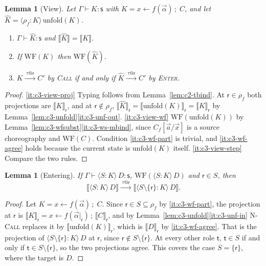 \documentclass[11pt]{report}
\makeatletter
\theoremstyle{plain}
\newtheorem{lemma}[theorem]{Lemma}
\theoremstyle{definition}
\theoremstyle{remark}
\newcommand{\rr}{\mathsf{r}}
\newcommand{\sr}{\mathsf{s}}
\newcommand{\tr}{\mathsf{t}}
\newcommand{\bind}[3]{#1 \leftarrow #2\,;\;#3}
\newcommand{\rt}[3]{\langle #1 : #2\rangle\,#3}
\newcommand{\unfold}[1]{\mathrm{unfold}(#1)}
\newcommand{\WF}{\mathrm{WF}}
\newcommand{\tauat}[1]{\tau\mathord{@}#1}
\newcommand{\lto}[1]{\xrightarrow{\;#1\;}}
\newcommand{\proj}[2]{\llbracket #1 \rrbracket_{#2}}
\newcommand{\projn}[1]{\llbracket #1 \rrbracket}
\newcommand{\rn}[1]{{\normalfont\scshape #1}}
\makeatother
\begin{document}
\begin{lemma}[View]\label{lem:c3-view}
  Let $\Gamma\vdash K:\sr$ with $K=\bind{x}{f(\vec\alpha)}{C}$, and let
  $\widehat{K}=\rt{\rho_f}{K}{\unfold{K}}$.
  \begin{enumerate}[label=(\roman*),nosep]
  \item\label{it:c3-view-proj} $\Gamma\vdash \widehat{K}:\sr$ and $\projn{\widehat{K}}=\projn{K}$.
  \item\label{it:c3-view-wf} If $\WF(K)$ then $\WF(\widehat{K})$.
  \item\label{it:c3-view-step} $K\lto{\tauat{\rr}}C'$ by \rn{Call} if and only
    if $\widehat{K}\lto{\tauat{\rr}}C'$ by \rn{Enter}.
  \end{enumerate}
\end{lemma}
\begin{proof}
  \ref{it:c3-view-proj} Typing follows from Lemma~\ref{lem:c2-tbind}.  At
  $\rr\in\rho_f$ both projections are $\proj{K}{\rr}$, and at
  $\rr\notin\rho_f$, $\proj{\widehat{K}}{\rr}=\proj{\unfold{K}}{\rr}=\proj{K}{\rr}$ by
  Lemma~\ref{lem:c3-unfold}\ref{it:c3-unf-out}.
  \ref{it:c3-view-wf} $\WF(\unfold{K})$ by
  Lemma~\ref{lem:c3-wfsubst}\ref{it:c3-ws-mbind}, since $C_f[\vec a/\vec x]$
  is a source choreography and $\WF(C)$.  Condition \ref{it:c3-wf-part} is
  trivial, and \ref{it:c3-wf-agree} holds because the current state is
  $\unfold{K}$ itself.
  \ref{it:c3-view-step} Compare the two rules.
\end{proof}

\begin{lemma}[Entering]\label{lem:c3-entering}
  If $\Gamma\vdash\rt{S}{K}{D}:\sr$, $\WF(\rt{S}{K}{D})$ and $\rr\in S$, then
  \[
    \projn{\rt{S}{K}{D}} \lto{\tauat{\rr}} \projn{\rt{S\setminus\{\rr\}}{K}{D}}.
  \]
\end{lemma}
\begin{proof}
  Let $K=\bind{x}{f(\vec\alpha)}{C}$.  Since $\rr\in S\subseteq\rho_f$ by
  \ref{it:c3-wf-part}, the projection at $\rr$ is
  $\proj{K}{\rr}=x\leftarrow f(\vec\alpha|_\rr)\,;\,\proj{C}{\rr}$, and by
  Lemma~\ref{lem:c3-unfold}\ref{it:c3-unf-in} \rn{N-Call} replaces it by
  $\proj{\unfold{K}}{\rr}$, which is $\proj{D}{\rr}$ by \ref{it:c3-wf-agree}.
  That is the projection of $\rt{S\setminus\{\rr\}}{K}{D}$ at $\rr$, since
  $\rr\notin S\setminus\{\rr\}$.  At every other role $\tr$, $\tr\in S$ if
  and only if $\tr\in S\setminus\{\rr\}$, so the two projections agree.  This
  covers the case $S=\{\rr\}$, where the target is $D$.
\end{proof}
\end{document}

